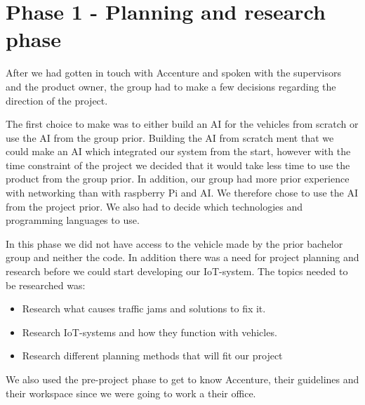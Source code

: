 \section{Phase 1 - Planning and research phase}

After we had gotten in touch with Accenture and spoken with the supervisors and the product owner, the group had to make a few decisions regarding the direction of the project.

The first choice to make was to either build an AI for the vehicles from scratch or use the AI from the group prior. Building the AI from scratch ment that we could make an AI which integrated our system from the start, however with the time constraint of the project we decided that it would take less time to use the product from the group prior. In addition, our group had more prior experience with networking than with raspberry Pi and AI. We therefore chose to use the AI from the project prior. We also had to decide which technologies and programming languages to use.

In this phase we did not have access to the vehicle made by the prior bachelor group and neither the code. In addition there was a need for project planning and research before we could start developing our IoT-system. The topics needed to be researched was:

\begin{itemize}
\item Research what causes traffic jams and solutions to fix it.
\item Research IoT-systems and how they function with vehicles.
\item Research different planning methods that will fit our project
\end{itemize}
We also used the pre-project phase to get to know Accenture, their guidelines and their workspace since we were going to work a their office. 









